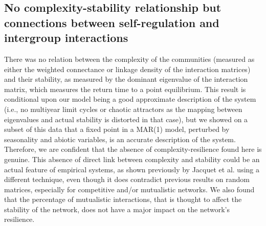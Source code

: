 \documentclass[9pt,twocolumn,twoside,lineno]{pnas-new}
\begin{document}
\subsection*{No complexity-stability relationship but connections between self-regulation
and intergroup interactions}

There was no relation between the complexity of the communities (measured
as either the weighted connectance or linkage density of the interaction
matrices) and their stability, as measured by the dominant eigenvalue
of the interaction matrix, which measures the return time to a point
equilibrium. This result is conditional upon our model being a good
approximate description of the system (i.e., no multiyear limit cycles
or chaotic attractors as the mapping between eigenvalues and actual
stability is distorted in that case\cite{certain_how_2018}),
but we showed on a subset of this data that a fixed point in a MAR(1)
model, perturbed by seasonality and abiotic variables, is an accurate
description of the system\cite{barraquand_coastal_2018}. Therefore,
we are confident that the absence of complexity-resilience found here
is genuine. This absence of direct link between complexity and stability
could be an actual feature of empirical systems, as shown previously
by Jacquet et al.\cite{jacquet_no_2016} using a different technique,
even though it does contradict previous results on random matrices,
especially for competitive and/or mutualistic networks\cite{allesina_stability_2012}.
We also found that the percentage of mutualistic interactions, that
is thought to affect the stability of the network\cite{mougi2012diversity,coyte_ecology_2015,garcia-callejas_multiple_2018},
does not have a major impact on the network's resilience.
\end{document}
